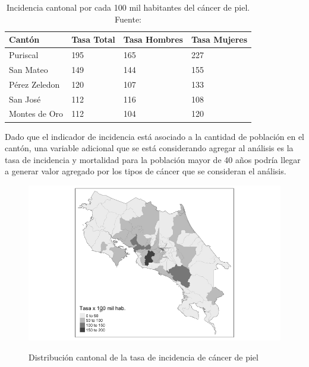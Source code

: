 \documentclass[12pt]{sciposter}
\begin{document}
\begin{multicols}{2}
\begin{table}[t]
\begin{center}
\begin{tabular}{llll}
Cantón   & Tasa Total    & Tasa Hombres & Tasa Mujeres \\ \hline
Puriscal & 195       & 165     & 227        \\
San Mateo   & 149     & 144        & 155          \\
Pérez Zeledon & 120 & 107 & 133                                      \\
San José      & 112 & 116 & 108                                      \\
Montes de Oro    & 112    & 104       & 120     \\   \hline   
\end{tabular}
\caption{Incidencia cantonal por cada 100 mil habitantes del cáncer de piel. Fuente: \cite{Salud} }
\label{tabla1}
\end{center}
\end{table}

Dado que el indicador de incidencia está asociado a la cantidad de población en el cantón, una variable adicional que se está considerando agregar al análisis es la tasa de incidencia y mortalidad para la población mayor de 40 años podría llegar a generar valor agregado por los tipos de cáncer que se consideran el análisis.
\bigskip

\begin{figure}[h]
\begin{center}
\label{can_piel}
\includegraphics[scale=1.55]{graf3.png}
\caption{Distribución cantonal de la tasa de incidencia de cáncer de piel}
\end{center}
\end{figure}



\end{multicols}
\end{document}
